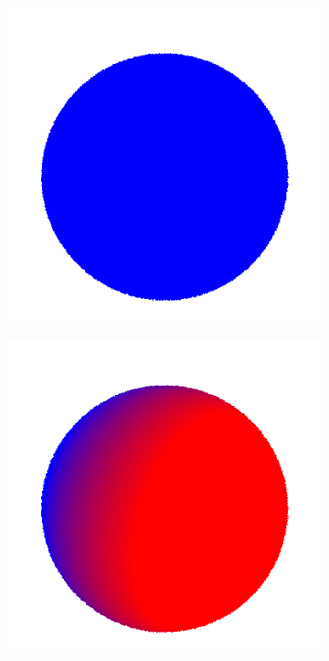 \documentclass{article}
\begin{document}
\begin{figure}[!h]
 \centering
\begin{subfigure}{.1\textwidth}
  \centering
  \includegraphics[width=\linewidth]{figs/spherical_harmonics/harmonics_0.png}  
\end{subfigure}
\begin{subfigure}{.1\textwidth}
  \centering
  \includegraphics[width=\linewidth]{figs/spherical_harmonics/harmonics_1.png}  

\end{subfigure}
\end{figure}
\end{document}
